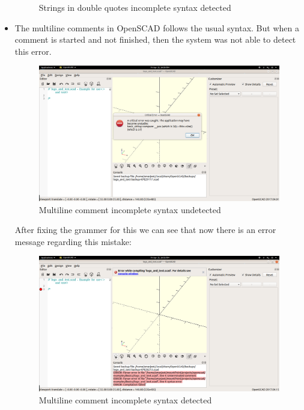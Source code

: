 \begin{itemize}
\begin{figure}
		\caption{Strings in double quotes incomplete syntax detected}
	\end{figure}
	\item The multiline comments in OpenSCAD follows the usual syntax. But when a comment is started and not finished, then the system was not able to detect this error.
	\begin{figure}
		\centering
		\includegraphics[width=\linewidth]{images/output/grammer_comment_old.png}
		\caption{Multiline comment incomplete syntax undetected}
	\end{figure}
	After fixing the grammer for this we can see that now there is an error message regarding this mistake:
	\begin{figure}
		\centering
		\includegraphics[width=\linewidth]{images/output/grammer_comment_new.png}
		\caption{Multiline comment incomplete syntax detected}
	\end{figure}
\end{itemize}
